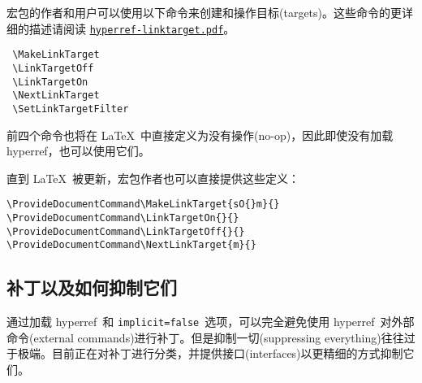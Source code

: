 \documentclass{article}
\newcommand*{\xpackage}[1]{\textsf{#1}}
\newcommand{\heiti}{\CJKfamily{heiti}} %
\begin{document}
宏包的作者和用户可以使用以下命令来创建和操作目标(targets)。这些命令的更详细的描述请阅读 \href{run:hyperref-linktarget.pdf}{\texttt{hyperref-linktarget.pdf}}。

\begin{verbatim}
 \MakeLinkTarget
 \LinkTargetOff
 \LinkTargetOn
 \NextLinkTarget
 \SetLinkTargetFilter
\end{verbatim}

前四个命令也将在 \LaTeX{}\ 中直接定义为没有操作(no-op)，因此即使没有加载 \xpackage{hyperref}，也可以使用它们。

直到 \LaTeX{}\ 被更新，宏包作者也可以直接提供这些定义：

\begin{verbatim}
\ProvideDocumentCommand\MakeLinkTarget{sO{}m}{}
\ProvideDocumentCommand\LinkTargetOn{}{}
\ProvideDocumentCommand\LinkTargetOff{}{}
\ProvideDocumentCommand\NextLinkTarget{m}{}
\end{verbatim}

\subsection[补丁以及如何抑制它们]{\heiti 补丁以及如何抑制它们}

通过加载 \xpackage{hyperref}\ 和 \texttt{implicit=false}\ 选项，可以完全避免使用 \xpackage{hyperref}\ 对外部命令(external commands)进行补丁。但是抑制一切(suppressing everything)往往过于极端。目前正在对补丁进行分类，并提供接口(interfaces)以更精细的方式抑制它们。
\end{document}
